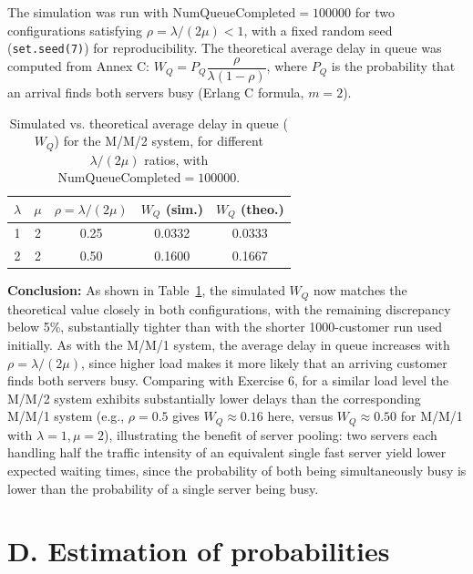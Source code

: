 \documentclass[12pt]{article}
\begin{document}
The simulation was run with $\text{NumQueueCompleted}=100000$ for two configurations satisfying $\rho=\lambda/(2\mu)<1$, with a fixed random seed (\texttt{set.seed(7)}) for reproducibility. The theoretical average delay in queue was computed from Annex C: $W_Q = P_Q \dfrac{\rho}{\lambda(1-\rho)}$, where $P_Q$ is the probability that an arrival finds both servers busy (Erlang C formula, $m=2$).

\begin{table}[H]
\centering
\begin{tabular}{|c|c|c|c|c|}
\hline
$\lambda$ & $\mu$ & $\rho=\lambda/(2\mu)$ & $W_Q$ (sim.) & $W_Q$ (theo.) \\
\hline
1 & 2 & 0.25 & 0.0332 & 0.0333 \\
2 & 2 & 0.50 & 0.1600 & 0.1667 \\
\hline
\end{tabular}
\caption{Simulated vs. theoretical average delay in queue ($W_Q$) for the M/M/2 system, for different $\lambda/(2\mu)$ ratios, with $\text{NumQueueCompleted}=100000$.}
\label{tab:ex7_results}
\end{table}

\textbf{Conclusion:} As shown in Table~\ref{tab:ex7_results}, the simulated $W_Q$ now matches the theoretical value closely in both configurations, with the remaining discrepancy below 5\%, substantially tighter than with the shorter 1000-customer run used initially. As with the M/M/1 system, the average delay in queue increases with $\rho=\lambda/(2\mu)$, since higher load makes it more likely that an arriving customer finds both servers busy. Comparing with Exercise 6, for a similar load level the M/M/2 system exhibits substantially lower delays than the corresponding M/M/1 system (e.g., $\rho=0.5$ gives $W_Q\approx0.16$ here, versus $W_Q\approx0.50$ for M/M/1 with $\lambda=1,\mu=2$), illustrating the benefit of server pooling: two servers each handling half the traffic intensity of an equivalent single fast server yield lower expected waiting times, since the probability of both being simultaneously busy is lower than the probability of a single server being busy.

\section{D. Estimation of probabilities}
\end{document}
